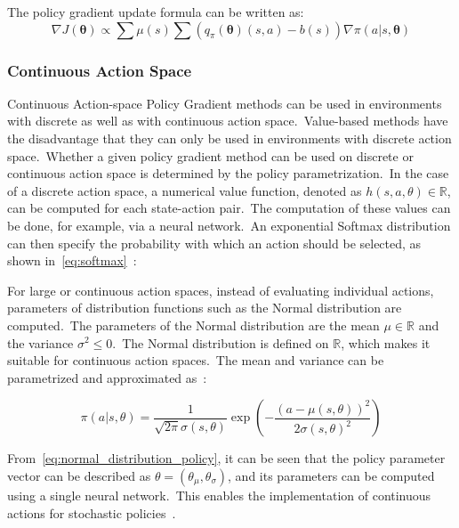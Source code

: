 \documentclass[../xlapes02]{subfiles}
\begin{document}
    The policy gradient update formula can be written as:
    \begin{equation}
        \label{eq:policy_gradient_update_formula}
        \nabla J(\bm{\theta})\propto\sum\mu(s)\sum(q_\pi(\bm{\theta})(s,a)-b(s))\nabla\pi(a|s,\bm{\theta})
    \end{equation}

    \subsubsection{Continuous Action Space}
    Continuous Action-space Policy Gradient methods can be used in environments with discrete as well as with continuous action space.\ Value-based methods have the disadvantage that they can only be used in environments with discrete action space.\ Whether a given policy gradient method can be used on discrete or continuous action space is determined by the policy parametrization.\ In the case of a discrete action space, a numerical value function, denoted as $ h(s, a, \theta) \in \mathbb{R} $, can be computed for each state-action pair.\ The computation of these values can be done, for example, via a neural network.\ An exponential Softmax distribution can then specify the probability with which an action should be selected, as shown in~\cref{eq:softmax}~\cite{FITMT25127, sutton2018reinforcement}:

    For large or continuous action spaces, instead of evaluating individual actions, parameters of distribution functions such as the Normal distribution are computed.\ The parameters of the Normal distribution are the mean $\mu\in\mathbb{R} $ and the variance $ \sigma^2\leq 0$.\ The Normal distribution is defined on $\mathbb{R}$, which makes it suitable for continuous action spaces.\ The mean and variance can be parametrized and approximated as~\cite{sutton2018reinforcement}:

    \begin{equation}
        \label{eq:normal_distribution_policy}
        \pi(a | s, \theta) = \frac{1}{\sqrt{2\pi} \sigma(s, \theta)} \exp\left(-\frac{(a - \mu(s, \theta))^2}{2\sigma(s, \theta)^2}\right) \tag{2.37}
    \end{equation}

    From~\cref{eq:normal_distribution_policy}, it can be seen that the policy parameter vector can be described as $ \theta = (\theta_{\mu}, \theta_{\sigma}) $, and its parameters can be computed using a single neural network.\ This enables the implementation of continuous actions for stochastic policies~\cite{FITMT25127, sutton2018reinforcement, rl-course-david-silver}.
\end{document}
